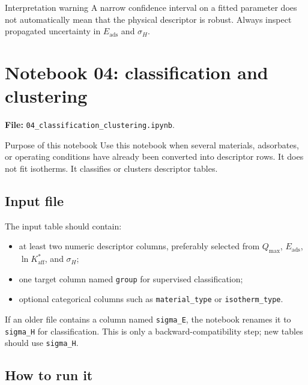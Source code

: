 \documentclass[journal=jacsat,manuscript=article]{achemso}
\begin{document}
\begin{redbox}{Interpretation warning}
	A narrow confidence interval on a fitted parameter does not automatically
	mean that the physical descriptor is robust. Always inspect propagated
	uncertainty in \(E_{\mathrm{ads}}\) and \(\sigma_H\).
\end{redbox}

\section{Notebook 04: classification and clustering}
\label{app:si_notebook_04}

\noindent\textbf{File:} \texttt{04\_classification\_clustering.ipynb}.

\begin{bluebox}{Purpose of this notebook}
	Use this notebook when several materials, adsorbates, or operating
	conditions have already been converted into descriptor rows. It does not
	fit isotherms. It classifies or clusters descriptor tables.
\end{bluebox}

\subsection*{Input file}

The input table should contain:
\begin{itemize}
	\item at least two numeric descriptor columns, preferably selected from
	\(Q_{\max}\), \(E_{\mathrm{ads}}\), \(\ln K_{\mathrm{aff}}^{\ast}\), and
	\(\sigma_H\);
	\item one target column named \texttt{group} for supervised classification;
	\item optional categorical columns such as \texttt{material\_type} or
	\texttt{isotherm\_type}.
\end{itemize}
If an older file contains a column named \texttt{sigma\_E}, the notebook
renames it to \texttt{sigma\_H} for classification. This is only a
backward-compatibility step; new tables should use \texttt{sigma\_H}.

\subsection*{How to run it}
\end{document}
